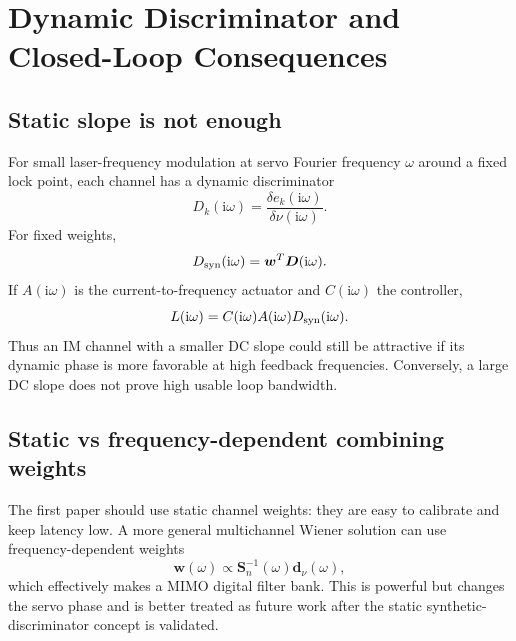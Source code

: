 \documentclass[10pt]{article}
\newcommand{\vect}[1]{\bm{#1}}
\newcommand{\ii}{\mathrm{i}}
\begin{document}
\section{Dynamic Discriminator and Closed-Loop Consequences}

\subsection{Static slope is not enough}
For small laser-frequency modulation at servo Fourier frequency $\omega$ around a fixed lock point, each channel has a dynamic discriminator
\begin{equation}
D_k(\ii\omega)=\frac{\delta e_k(\ii\omega)}{\delta\nu(\ii\omega)}.
\end{equation}
For fixed weights,
\begin{equation}
D_{\rm syn}(\ii\omega)=\vect w^T\vect D(\ii\omega).
\end{equation}
If $A(\ii\omega)$ is the current-to-frequency actuator and $C(\ii\omega)$ the controller,
\begin{equation}
L(\ii\omega)=C(\ii\omega)A(\ii\omega)D_{\rm syn}(\ii\omega).
\end{equation}
Thus an IM channel with a smaller DC slope could still be attractive if its dynamic phase is more favorable at high feedback frequencies. Conversely, a large DC slope does not prove high usable loop bandwidth.

\subsection{Static vs frequency-dependent combining weights}
The first paper should use static channel weights: they are easy to calibrate and keep latency low. A more general multichannel Wiener solution can use frequency-dependent weights
\begin{equation}
\vect w(\omega)\propto\vect S_n^{-1}(\omega)\vect d_\nu(\omega),
\end{equation}
which effectively makes a MIMO digital filter bank. This is powerful but changes the servo phase and is better treated as future work after the static synthetic-discriminator concept is validated.
\end{document}
